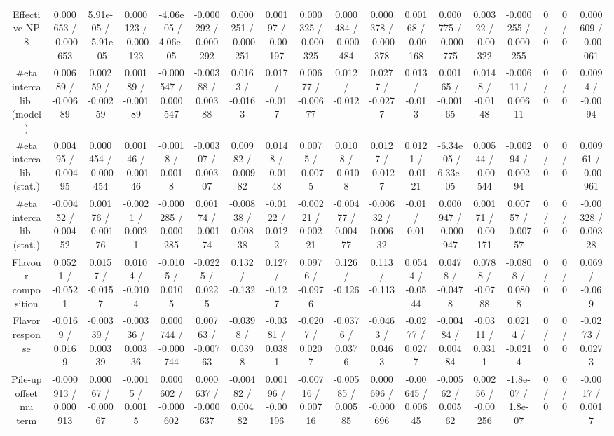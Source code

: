 \documentclass[10pt]{article}
\begin{document}
\begin{table}[htbp]
\begin{center}
\begin{tabular}{|c|c|c|c|c|c|c|c|c|c|c|c|c|c|c|c|c|c|}
  Effective NP 8 & 0.000653 / -0.000653 & 5.91e-05 / -5.91e-05 & 0.000123 / -0.000123 & -4.06e-05 / 4.06e-05 & -0.000292 / 0.000292 & 0.000251 / -0.000251 & 0.00197 / -0.00197 & 0.000325 / -0.000325 & 0.000484 / -0.000484 & 0.000378 / -0.000378 & 0.00168 / -0.00168 & 0.000775 / -0.000775 & 0.00322 / -0.00322 & -0.000255 / 0.000255 & 0 / 0 & 0 / 0 & 0.000609 / -0.00061 \\ 
  #eta intercalib. (model) & 0.00689 / -0.00689 & 0.00259 / -0.00259 & 0.00189 / -0.00189 & -0.000547 / 0.000547 & -0.00388 / 0.00388 & 0.0163 / -0.0163 & 0.017 / -0.017 & 0.00677 / -0.00677 & 0.012 / -0.012 & 0.0277 / -0.0277 & 0.013 / -0.013 & 0.00165 / -0.00165 & 0.0148 / -0.0148 & -0.00611 / 0.00611 & 0 / 0 & 0 / 0 & 0.0094 / -0.0094 \\ 
  #eta intercalib. (stat.) & 0.00495 / -0.00495 & 0.000454 / -0.000454 & 0.00146 / -0.00146 & -0.0018 / 0.0018 & -0.00307 / 0.00307 & 0.00982 / -0.00982 & 0.0148 / -0.0148 & 0.0075 / -0.0075 & 0.0108 / -0.0108 & 0.0127 / -0.0127 & 0.0121 / -0.0121 & -6.34e-05 / 6.33e-05 & 0.00544 / -0.00544 & -0.00294 / 0.00294 & 0 / 0 & 0 / 0 & 0.00961 / -0.00961 \\ 
  #eta intercalib. (stat.) & -0.00452 / 0.00452 & 0.00176 / -0.00176 & -0.0021 / 0.0021 & -0.000285 / 0.000285 & 0.00174 / -0.00174 & -0.00838 / 0.00838 & -0.0122 / 0.0122 & -0.00221 / 0.00221 & -0.00477 / 0.00477 & -0.00632 / 0.00632 & -0.01 / 0.01 & 0.000947 / -0.000947 & 0.00171 / -0.00171 & 0.00757 / -0.00757 & 0 / 0 & 0 / 0 & -0.00328 / 0.00328 \\ 
  Flavour composition & 0.0521 / -0.0521 & 0.0157 / -0.0157 & 0.0104 / -0.0104 & -0.0105 / 0.0105 & -0.0225 / 0.0225 & 0.132 / -0.132 & 0.127 / -0.127 & 0.0976 / -0.0976 & 0.126 / -0.126 & 0.113 / -0.113 & 0.0544 / -0.0544 & 0.0478 / -0.0478 & 0.0788 / -0.0788 & -0.0808 / 0.0808 & 0 / 0 & 0 / 0 & 0.069 / -0.069 \\ 
  Flavor response & -0.0169 / 0.0169 & -0.00339 / 0.00339 & -0.00336 / 0.00336 & 0.000744 / -0.000744 & 0.00763 / -0.00763 & -0.0398 / 0.0398 & -0.0381 / 0.0381 & -0.0207 / 0.0207 & -0.0376 / 0.0376 & -0.0463 / 0.0463 & -0.0277 / 0.0277 & -0.00484 / 0.00484 & -0.0311 / 0.0311 & 0.0214 / -0.0214 & 0 / 0 & 0 / 0 & -0.0273 / 0.0273 \\ 
  Pile-up offset mu term & -0.000913 / 0.000913 & 0.00067 / -0.00067 & -0.0015 / 0.0015 & 0.000602 / -0.000602 & 0.000637 / -0.000637 & -0.00482 / 0.00482 & 0.00196 / -0.00196 & -0.00716 / 0.00716 & -0.00585 / 0.00585 & 0.000696 / -0.000696 & -0.00645 / 0.00645 & -0.00562 / 0.00562 & 0.00256 / -0.00256 & -1.8e-07 / 1.8e-07 & 0 / 0 & 0 / 0 & -0.0017 / 0.0017 \\ 

\end{tabular}
\end{center}
\end{table}
\end{document}
